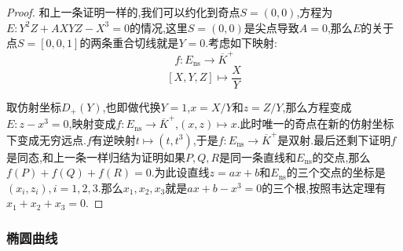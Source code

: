 \begin{enumerate}
\begin{proof}
		和上一条证明一样的,我们可以约化到奇点$S=(0,0)$,方程为$E:Y^2Z+AXYZ-X^3=0$的情况,这里$S=(0,0)$是尖点导致$A=0$,那么$E$的关于点$S=[0,0,1]$的两条重合切线就是$Y=0$.考虑如下映射:
		$$f:E_{\mathrm{ns}}\to\overline{K}^+$$
		$$[X,Y,Z]\mapsto\frac{X}{Y}$$
		
		取仿射坐标$D_+(Y)$,也即做代换$Y=1$,$x=X/Y$和$z=Z/Y$,那么方程变成$E:z-x^3=0$,映射变成$f:E_{\mathrm{ns}}\to\overline{K}^+$,$(x,z)\mapsto x$.此时唯一的奇点在新的仿射坐标下变成无穷远点.$f$有逆映射$t\mapsto(t,t^3)$,于是$f:E_{\mathrm{ns}}\to\overline{K}^+$是双射.最后还剩下证明$f$是同态,和上一条一样归结为证明如果$P,Q,R$是同一条直线和$E_{\mathrm{ns}}$的交点,那么$f(P)+f(Q)+f(R)=0$.为此设直线$z=ax+b$和$E_{\mathrm{ns}}$的三个交点的坐标是$(x_i,z_i),i=1,2,3$.那么$x_1,x_2,x_3$就是$ax+b-x^3=0$的三个根,按照韦达定理有$x_1+x_2+x_3=0$.
	\end{proof}
\end{enumerate}
\subsubsection{椭圆曲线}

